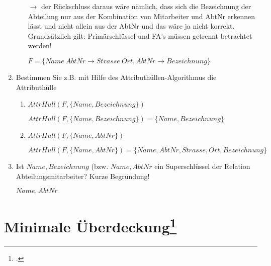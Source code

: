 \documentclass{lehramt-informatik-haupt}
\begin{document}
\begin{enumerate}
\begin{liAntwort}
\begin{itemize}
$\rightarrow$ der Rückschluss daraus wäre nämlich, dass sich die
Bezeichnung der Abteilung nur aus der Kombination von Mitarbeiter und
AbtNr erkennen lässt und nicht allein aus der AbtNr und das wäre ja
nicht korrekt. Grundsätzlich gilt: Primärschlüssel und FA’s müssen
getrennt betrachtet werden!

$F = \{
  Name\ AbtNr \rightarrow Strasse\ Ort,
  AbtNr \rightarrow Bezeichnung
\}$
\end{itemize}

\end{liAntwort}


\item Bestimmen Sie z.B. mit Hilfe des Attributhüllen-Algorithmus die
Attributhülle

\renewcommand{\labelenumii}{\arabic{enumii}.}
\begin{enumerate}


\item $AttrHull(F, \{Name, Bezeichnung\})$

\begin{liAntwort}
$AttrHull(F, \{Name, Bezeichnung\}) = \{Name, Bezeichnung\}$
\end{liAntwort}


\item $AttrHull(F, \{Name, AbtNr\})$

\begin{liAntwort}
$AttrHull(F, \{Name, AbtNr\}) = \{Name, AbtNr, Strasse, Ort, Bezeichnung\}$
\end{liAntwort}
\end{enumerate}


\item Ist ${Name, Bezeichnung}$ (bzw. ${Name, AbtNr}$ ein Superschlüssel
der Relation Abteilungsmitarbeiter? Kurze Begründung!

\begin{liAntwort}
${Name, AbtNr}$
\end{liAntwort}

\end{enumerate}

%

\section{Minimale Überdeckung\footcite[Seite 1, Aufgabe 2]{db:ab:5}}
\end{document}
